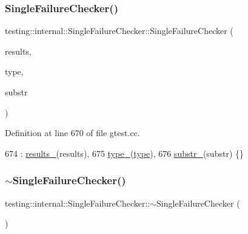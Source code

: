 \subsubsection{\texorpdfstring{Single\+Failure\+Checker()}{SingleFailureChecker()}}
{\footnotesize\ttfamily testing\+::internal\+::\+Single\+Failure\+Checker\+::\+Single\+Failure\+Checker (\begin{DoxyParamCaption}\item[{const \hyperlink{classtesting_1_1TestPartResultArray}{Test\+Part\+Result\+Array} $\ast$}]{results,  }\item[{\hyperlink{classtesting_1_1TestPartResult_a65ae656b33fdfdfffaf34858778a52d5}{Test\+Part\+Result\+::\+Type}}]{type,  }\item[{const \hyperlink{namespacetesting_1_1internal_a8e8ff5b11e64078831112677156cb111}{string} \&}]{substr }\end{DoxyParamCaption})}



Definition at line 670 of file gtest.\+cc.


\begin{DoxyCode}
674     : \hyperlink{classtesting_1_1internal_1_1SingleFailureChecker_af6216677e2186e9481088daf57c17d21}{results\_}(results),
675       \hyperlink{classtesting_1_1internal_1_1SingleFailureChecker_a8fc33138c357b2a6ede3698eb57548a7}{type\_}(\hyperlink{namespacegenerate__debs_a50bc9a7ecac9584553e089a448bcde58}{type}),
676       \hyperlink{classtesting_1_1internal_1_1SingleFailureChecker_a2003215f5f3147726e0b3bb4c8954d71}{substr\_}(substr) \{\}
\end{DoxyCode}
\mbox{\label{classtesting_1_1internal_1_1SingleFailureChecker_a4b0a907c9c1b350c79d70af138e9f0bf}} 
\subsubsection{\texorpdfstring{$\sim$\+Single\+Failure\+Checker()}{~SingleFailureChecker()}}
{\footnotesize\ttfamily testing\+::internal\+::\+Single\+Failure\+Checker\+::$\sim$\+Single\+Failure\+Checker (\begin{DoxyParamCaption}{ }\end{DoxyParamCaption})}



